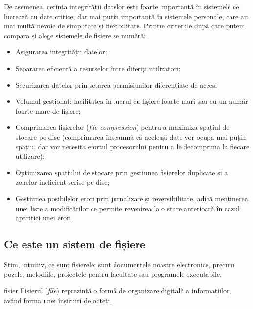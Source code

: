 De asemenea, cerința integrității datelor este foarte importantă în sistemele
ce lucrează cu date critice, dar mai puțin importantă în sistemele personale,
care au mai multă nevoie de simplitate și flexibilitate. Printre criteriile după
care putem compara și alege sistemele de fișiere se numără:

%	

\begin{itemize}
	\item Asigurarea integrității datelor;
	\item Separarea eficientă a resurselor între diferiți utilizatori;
	\item Securizarea datelor prin setarea permisiunilor diferențiate de acces;
	\item Volumul gestionat: facilitatea în lucrul cu fișiere foarte mari
		sau cu un număr foarte mare de fișiere;
	\item Comprimarea fișierelor (\textit{file compression}) pentru a
		maximiza spațiul de stocare pe disc (comprimarea înseamnă că
		aceleași date vor ocupa mai puțin spațiu, dar vor necesita
		efortul procesorului pentru a le decomprima la fiecare
		utilizare);
	\item Optimizarea spațiului de stocare prin gestiunea fișierelor
		duplicate și a zonelor ineficient scrise pe disc;
	\item Gestiunea posibilelor erori prin jurnalizare și reversibilitate,
		adică menținerea unei liste a modificărilor ce permite revenirea
		la o stare anterioară în cazul apariției unei erori.
\end{itemize}

\subsection{Ce este un sistem de fișiere}
\label{sec:file-system-baza-def}

Știm, intuitiv, ce sunt fișierele: sunt documentele noastre electronice,
precum pozele, melodiile, proiectele pentru facultate sau programele
executabile.

\begin{definition}{fișier}
Fișierul (\textit{file}) reprezintă o formă de organizare digitală a informațiilor, având forma unei înșiruiri de octeți.
\end{definition}

